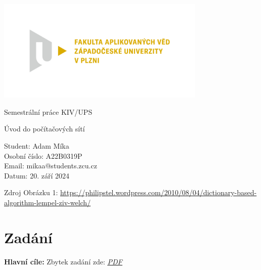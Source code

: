 \documentclass[12pt, a4paper]{article}
\begin{document}
\begin{titlepage}
    \includegraphics[width=0.75\textwidth]{img/fav.png}
    \begin{center}
        
        
        \vspace{2cm}
        
        \Huge
        Semestrální práce KIV/UPS
        
        \vspace{1cm}
        
        \LARGE
        Úvod do počítačových sítí
        
        \vfill
        
        \vspace{0.5cm}
        
        \normalsize
        \raggedright
        Student:        Adam Míka \\
        Osobní číslo:   A22B0319P \\
        Email:          mikaa@students.zcu.cz \\
        Datum:          20. září 2024
        \vspace{0.2cm}
        
    \end{center}
\end{titlepage}

\renewcommand{\cftsecleader}{\cftdotfill{\cftdotsep}}
\renewcommand{\cftsubsecleader}{\cftdotfill{\cftdotsep}}
\renewcommand{\cftsubsubsecleader}{\cftdotfill{\cftdotsep}}

\setcounter{page}{2}
\tableofcontents
\listoffigures
\lstlistoflistings
\begin{thebibliography}{99}
     Zdroj Obrázku 1: \url{https://philipstel.wordpress.com/2010/08/04/dictionary-based-algorithm-lempel-ziv-welch/}
  \end{thebibliography}
\pagebreak


\section{Zadání}
\large
\textbf{Hlavní cíle:}
\normalsize
Zbytek zadání zde: \href{https://home.zcu.cz/~ublm/files/PozadavkyUPS.pdf}{\textcolor[RGB]{20,20,200}{\underline{\textit{PDF}}}}
\end{document}
